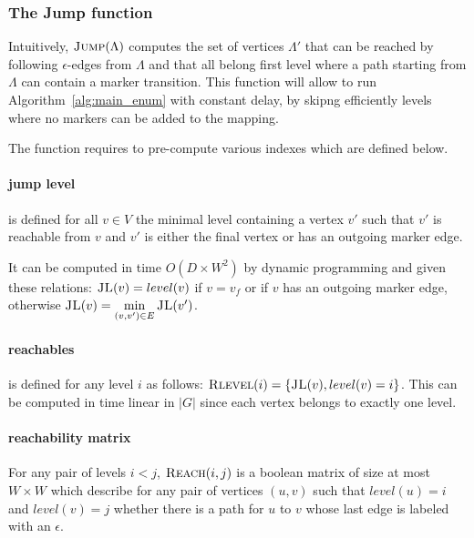 \documentclass[12px]{article}
\theoremstyle{definition}
\begin{document}
      \subsubsection{The Jump function}

        Intuitively, $\Call{Jump}{\Lambda}$ computes the set of vertices
        $\Lambda'$ that can be reached by following $\epsilon$-edges from
        $\Lambda$ and that all belong first level where a path starting from
        $\Lambda$ can contain a marker transition. This function will allow to
        run Algorithm~\ref{alg:main_enum} with constant delay, by skipng
        efficiently levels where no markers can be added to the mapping.

        The  function requires to pre-compute various indexes
        which are defined below.

        \paragraph{jump level}

           is defined for all $v \in V$ the minimal level
          containing a vertex $v'$ such that $v'$ is reachable from $v$ and
          $v'$ is either the final vertex or has an outgoing marker edge.

          It can be computed in time $O(D \times W^2)$ by dynamic programming
          and given these relations: $\Call{JL}{v} = level(v)$ if $v = v_f$ or
          if $v$ has an outgoing marker edge, otherwise $\Call{JL}{v} =
          \min\limits_{(v, v') \in E} \Call{JL}{v'}$.

        \paragraph{reachables}

           is defined for any level $i$ as follows:
          $\Call{Rlevel}{i} = \{\Call{JL}{v}, level(v) = i\}$. This can be
          computed in time linear in $|G|$ since each vertex belongs to exactly
          one level.

        \paragraph{reachability matrix}

          For any pair of levels $i < j$, $\Call{Reach}{i,j}$ is a boolean
          matrix of size at most $W \times W$ which describe for any pair of
          vertices $(u, v)$ such that $level(u) = i$ and $level(v) = j$ whether
          there is a path for $u$ to $v$ whose last edge is labeled with an
          $\epsilon$.
\end{document}
